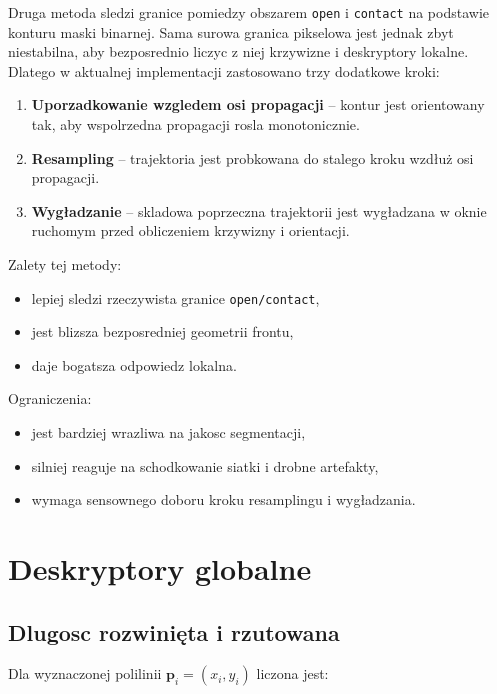 \documentclass[11pt,a4paper]{article}
\begin{document}
Druga metoda sledzi granice pomiedzy obszarem \texttt{open} i \texttt{contact}
na podstawie konturu maski binarnej. Sama surowa granica pikselowa jest jednak
zbyt niestabilna, aby bezposrednio liczyc z niej krzywizne i deskryptory
lokalne. Dlatego w aktualnej implementacji zastosowano trzy dodatkowe kroki:

\begin{enumerate}[leftmargin=1.5em]
    \item \textbf{Uporzadkowanie wzgledem osi propagacji} -- kontur jest
    orientowany tak, aby wspolrzedna propagacji rosla monotonicznie.
    \item \textbf{Resampling} -- trajektoria jest probkowana do stalego kroku
    wzdłuż osi propagacji.
    \item \textbf{Wygładzanie} -- skladowa poprzeczna trajektorii jest
    wygładzana w oknie ruchomym przed obliczeniem krzywizny i orientacji.
\end{enumerate}

Zalety tej metody:

\begin{itemize}[leftmargin=1.5em]
    \item lepiej sledzi rzeczywista granice \texttt{open/contact},
    \item jest blizsza bezposredniej geometrii frontu,
    \item daje bogatsza odpowiedz lokalna.
\end{itemize}

Ograniczenia:

\begin{itemize}[leftmargin=1.5em]
    \item jest bardziej wrazliwa na jakosc segmentacji,
    \item silniej reaguje na schodkowanie siatki i drobne artefakty,
    \item wymaga sensownego doboru kroku resamplingu i wygładzania.
\end{itemize}

\section{Deskryptory globalne}

\subsection{Dlugosc rozwinięta i rzutowana}

Dla wyznaczonej polilinii \(\mathbf{p}_i = (x_i, y_i)\) liczona jest:
\end{document}
